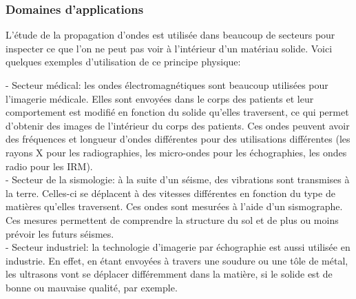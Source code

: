 \newpage

\subsubsection{\large Domaines d'applications}
L'étude de la propagation d'ondes est utilisée dans beaucoup de secteurs 
pour inspecter ce que l'on ne peut pas voir à l'intérieur d'un matériau
solide. Voici quelques exemples d'utilisation de ce principe physique:

- Secteur médical:
les ondes électromagnétiques sont beaucoup utilisées pour l'imagerie médicale. 
Elles sont envoyées dans le corps des patients et leur comportement est modifié
en fonction du solide qu'elles traversent, ce qui permet d'obtenir des images
de l'intérieur du corps des patients. Ces ondes peuvent avoir des fréquences et
longueur d'ondes différentes pour des utilisations différentes (les rayons X
pour les radiographies, les micro-ondes pour les échographies, les ondes radio
pour les IRM).~\cite{cea}\\


- Secteur de la sismologie:
à la suite d'un séisme, des vibrations sont transmises à la terre. Celles-ci se
déplacent à des vitesses différentes en fonction du type de matières qu'elles
traversent. Ces ondes sont mesurées à l'aide d'un sismographe. Ces mesures
permettent de comprendre la structure du sol et de plus ou moins prévoir les
futurs séismes.~\cite{wikipedia-echographie}\\


- Secteur industriel:
la technologie d'imagerie par échographie est aussi utilisée en industrie. En
effet, en étant envoyées à travers une soudure ou une tôle de métal, les
ultrasons vont se déplacer différemment dans la matière, si le solide est de
bonne ou mauvaise qualité, par exemple.\\


